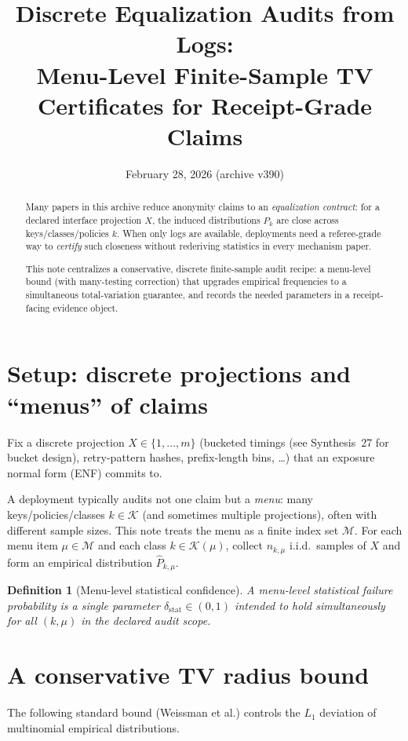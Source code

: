 \documentclass[11pt]{article}
\title{Discrete Equalization Audits from Logs:\\
\large Menu-Level Finite-Sample TV Certificates for Receipt-Grade Claims}
\author{}
\date{February 28, 2026 (archive v390)}
\newtheorem{definition}{Definition}
\begin{document}
\maketitle

\begin{abstract}
Many papers in this archive reduce anonymity claims to an \emph{equalization contract}:
for a declared interface projection $X$, the induced distributions $P_k$ are close across keys/classes/policies $k$.
When only logs are available, deployments need a referee-grade way to \emph{certify} such closeness without rederiving statistics in every mechanism paper.

This note centralizes a conservative, discrete finite-sample audit recipe:
a menu-level bound (with many-testing correction) that upgrades empirical frequencies to a simultaneous
total-variation guarantee, and records the needed parameters in a receipt-facing evidence object.
\end{abstract}

\section{Setup: discrete projections and ``menus'' of claims}
Fix a discrete projection $X\in\{1,\dots,m\}$ (bucketed timings (see Synthesis~27 for bucket design),\cite{series:bucketdesign}  retry-pattern hashes, prefix-length bins, \dots)
that an exposure normal form (ENF) commits to. \cite{series:traceifaces}

A deployment typically audits not one claim but a \emph{menu}:
many keys/policies/classes $k\in\mathcal K$ (and sometimes multiple projections),
often with different sample sizes.
This note treats the menu as a finite index set $\mathcal M$.
For each menu item $\mu\in\mathcal M$ and each class $k\in\mathcal K(\mu)$, collect $n_{k,\mu}$ i.i.d.\ samples of $X$
and form an empirical distribution $\widehat P_{k,\mu}$.

\begin{definition}[Menu-level statistical confidence]
A \emph{menu-level} statistical failure probability is a single parameter $\delta_{\mathrm{stat}}\in(0,1)$
intended to hold \emph{simultaneously} for all $(k,\mu)$ in the declared audit scope.
\end{definition}

\section{A conservative TV radius bound}
The following standard bound (Weissman et al.) controls the $L_1$ deviation of multinomial empirical distributions. \cite{Weissman2003L1}
\end{document}
